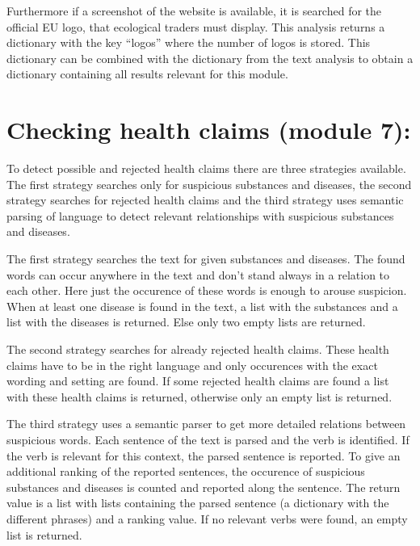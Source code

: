 \documentclass[letterpaper,10pt,english]{sphinxmanual}
\begin{document}
Furthermore if a screenshot of the website is available, it is
searched for the official EU logo, that ecological traders must
display. This analysis returns a dictionary with the key “logos” where
the number of logos is stored. This dictionary can be combined with
the dictionary from the text analysis to obtain a dictionary
containing all results relevant for this module.


\section{Checking health claims (module 7):}
\label{\detokenize{modules:checking-health-claims-module-7}}\label{\detokenize{modules:module-hc}}
To detect possible and rejected health claims there are three
strategies available. The first strategy searches only for suspicious
substances and diseases, the second strategy searches for rejected
health claims and the third strategy uses semantic parsing of language
to detect relevant relationships with suspicious substances and
diseases.

The first strategy searches the text for given substances and
diseases. The found words can occur anywhere in the text and don’t
stand always in a relation to each other. Here just the occurence of
these words is enough to arouse suspicion. When at least one disease
is found in the text, a list with the substances and a list with the
diseases is returned. Else only two empty lists are returned.

The second strategy searches for already rejected health claims. These
health claims have to be in the right language and only occurences
with the exact wording and setting are found. If some rejected health
claims are found a list with these health claims is returned,
otherwise only an empty list is returned.

The third strategy uses a semantic parser to get more detailed
relations between suspicious words. Each sentence of the text is
parsed and the verb is identified. If the verb is relevant for this
context, the parsed sentence is reported. To give an additional
ranking of the reported sentences, the occurence of suspicious
substances and diseases is counted and reported along the
sentence. The return value is a list with lists containing the parsed
sentence (a dictionary with the different phrases) and a ranking
value. If no relevant verbs were found, an empty list is returned.
\end{document}
